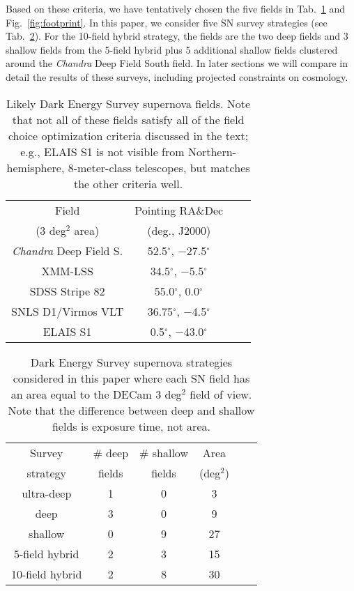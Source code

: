 \documentclass[preprint2]{aastex}    %
\begin{document}
Based on these criteria, we have tentatively chosen the five fields in Tab.~\ref{tab:fields}
and Fig.~\ref{fig:footprint}. In this paper, we consider five SN survey strategies (see Tab.~\ref{tab:strat}).
For the 10-field hybrid strategy, the fields are the two deep fields and 3 
shallow fields from the 5-field hybrid plus 5 additional shallow fields clustered around the \textit{Chandra} 
Deep Field South field. In later sections we will compare in detail the results of these surveys, including 
projected constraints on cosmology. 

\begin{table}[h]
\begin{center}
\begin{tabular}{cccc}
\hline
Field & Pointing RA\&Dec\\
(3 deg$^2$ area)      &  (deg., J2000)\\\hline
\textit{Chandra} Deep Field S. & 52.5$^{\circ}$, $-$27.5$^{\circ}$\\
XMM-LSS & 34.5$^{\circ}$, $-$5.5$^{\circ}$\\
SDSS Stripe 82 & 55.0$^{\circ}$, 0.0$^{\circ}$\\
SNLS D1/Virmos VLT & 36.75$^{\circ}$, $-$4.5$^{\circ}$\\
ELAIS S1 & 0.5$^{\circ}$, $-$43.0$^{\circ}$\\
\hline
\end{tabular}
\caption{Likely Dark Energy Survey supernova fields. Note that not all of these fields satisfy all
of the field choice optimization criteria discussed in the text; e.g., ELAIS S1 is not visible from 
Northern-hemisphere, 8-meter-class telescopes, but matches the other criteria well.}\label{tab:fields}
\end{center}
\end{table}

\begin{table}[h]
\begin{center}
\begin{tabular}{cccccc}
\hline
Survey & \# deep & \# shallow & Area\\
strategy & fields & fields & (deg$^2$)\\\hline
ultra-deep & 1 & 0 & 3\\
deep & 3 & 0 & 9\\
shallow & 0 & 9 & 27\\
5-field hybrid & 2 & 3 & 15\\
10-field hybrid & 2 & 8 & 30\\
\hline
\end{tabular}
\caption{Dark Energy Survey supernova strategies considered in this paper where each
SN field has an area equal to the DECam 3 deg$^2$ field of view. Note that the difference between 
deep and shallow fields is exposure time, not area. 
}\label{tab:strat}
\end{center}
\end{table}
\end{document}
